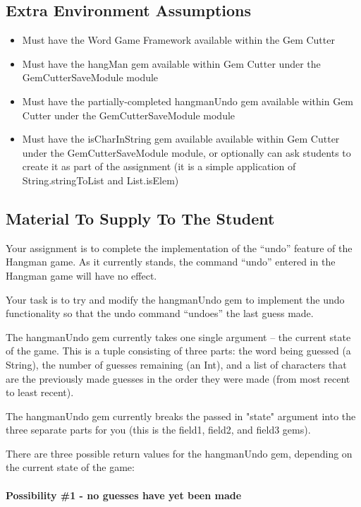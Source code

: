 	\subsection*{Extra Environment Assumptions}
		\begin{itemize}
			\item Must have the Word Game Framework available within the Gem Cutter
			\item Must have the hangMan gem available within Gem Cutter under the GemCutterSaveModule module
			\item Must have the partially-completed hangmanUndo gem available within Gem Cutter under the GemCutterSaveModule module
			\item Must have the isCharInString gem available available within Gem Cutter under the GemCutterSaveModule module, or optionally can ask students to create it as part of the assignment (it is a simple application of String.stringToList and List.isElem)
		\end{itemize}


\subsection*{Material To Supply To The Student}

Your assignment is to complete the implementation of the ``undo'' feature of the Hangman game.  As it currently stands, the command ``undo'' entered in the Hangman game will have no effect.

Your task is to try and modify the hangmanUndo gem to implement the undo functionality so that the undo command ``undoes'' the last guess made.  

The hangmanUndo gem currently takes one single argument -- the current state of the game.  This is a tuple consisting of three parts: the word being guessed (a String), the number of guesses remaining (an Int), and a list of characters that are the previously made guesses in the order they were made (from most recent to least recent).

The hangmanUndo gem currently breaks the passed in "state" argument into the three separate parts for you (this is the field1, field2, and field3 gems).

There are three possible return values for the hangmanUndo gem, depending on the current state of the game:

\paragraph*{Possibility \#1 - no guesses have yet been made}

